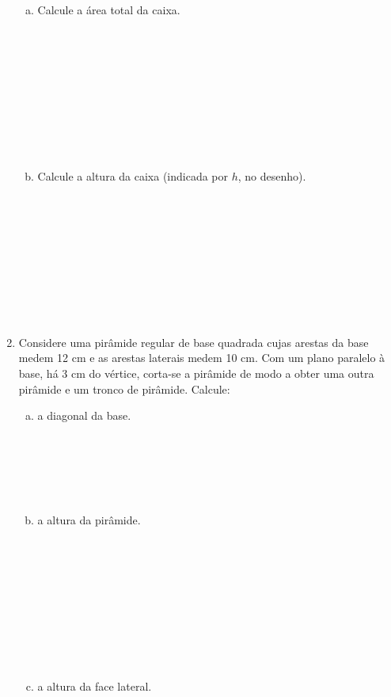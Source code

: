 \documentclass[a4paper,14pt]{article}
\begin{document}
\begin{multicols}{2}
\begin{enumerate}
\begin{enumerate}[a)]
	    		\item Calcule a área total da caixa.\\\\\\\\\\\\\\\\\\\\
	    		\item Calcule a altura da caixa (indicada por $h$, no desenho).\\\\\\\\\\\\\\\\\\\\
	        \end{enumerate}
            \item Considere uma pirâmide regular de base quadrada cujas arestas da base medem 12 cm e as arestas laterais medem 10 cm. Com um plano paralelo à base, há 3 cm do vértice, corta-se a pirâmide de modo a obter uma outra pirâmide e um tronco de pirâmide. Calcule:
            \begin{enumerate}[a)]
            	\item a diagonal da base.\\\\\\\\\\\\
            	\item a altura da pirâmide.\\\\\\\\\\\\\\\\\\\\
            	\item a altura da face lateral.\\\\\\\\\\\\\\\\\\\\

\end{enumerate}
\end{enumerate}
\end{multicols}
\end{document}
